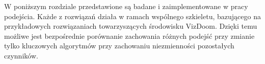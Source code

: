 W poniższym rozdziale przedstawione są badane i zaimplementowane w pracy podejścia. Każde z rozwiązań działa w ramach wspólnego szkieletu, bazującego na przykładowych rozwiązaniach towarzyszących środowisku VizDoom. Dzięki temu możliwe jest bezpośrednie porównanie zachowania różnych podejść przy zmianie tylko kluczowych algorytmów przy zachowaniu niezmienności pozostałych czynników.
